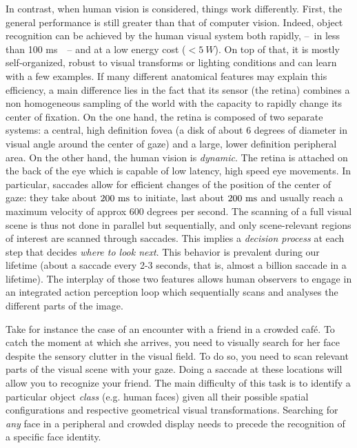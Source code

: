 In contrast, when human vision is considered, things work differently. First, the  general performance is still greater than that of computer vision.
Indeed, object recognition can be achieved by the human visual system both rapidly, --~in less than 100 ms~\cite{Kirchner06}~-- and at a low energy cost ($<5~W$). 
On top of that, it is mostly self-organized, robust to visual transforms or lighting conditions and can learn with a few examples. If many different anatomical features may explain this efficiency, a main difference lies in the fact that its sensor (the retina) combines a non homogeneous sampling of the world with the capacity to rapidly change its center of fixation. On the one hand, the retina is composed of two separate systems: a central, high definition fovea (a disk of about 6 degrees of diameter in visual angle around the center of gaze) and a large, lower definition peripheral area. 
On the other hand, the human vision is \emph{dynamic}. The retina is attached on the back of the eye which is capable of low latency, high speed eye movements. In particular, saccades allow for efficient changes of the position of the center of gaze: they take about $200~\si{\milli\second}$ to initiate, last about $200~\si{\milli\second}$ and usually reach a maximum velocity of approx 600 degrees per second. The scanning of a full visual scene is thus  not done in parallel but sequentially, and only scene-relevant regions of interest are scanned through saccades. This implies a \emph{decision process} at each step that decides \emph{where to look next}. This behavior is prevalent during our lifetime (about a saccade every 2-3 seconds, that is, almost a billion saccade in a lifetime). The interplay of those two features allows human observers to engage in an integrated action perception loop which sequentially scans and analyses the different parts of the image.


Take for instance the case of an encounter with a friend in a crowded café. To catch the moment at which she arrives, you need to visually search for her face despite the sensory clutter in the visual field. To do so, you need to scan relevant parts of the visual scene with your gaze. Doing a saccade at these locations will allow you to recognize your friend. The main difficulty of this task is to identify a particular object \emph{class} (e.g. human faces) given all their possible spatial configurations and respective geometrical visual transformations. Searching for \emph{any} face in a peripheral and crowded display needs to precede the recognition of a specific face identity. 


